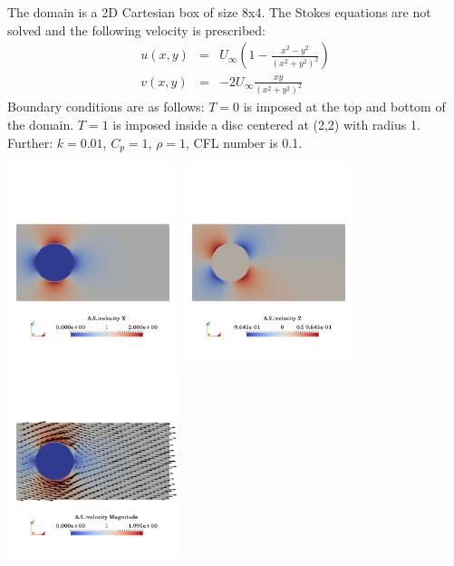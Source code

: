 The domain is a 2D Cartesian box of size 8x4.
The Stokes equations are not solved and the following velocity is prescribed:
\begin{eqnarray}
u(x,y)&=& U_\infty \left(  1-\frac{x^2-y^2}{(x^2+y^2)^2}  \right) \\
v(x,y)&=& -2U_\infty \frac{xy}{(x^2+y^2)^2}
\end{eqnarray}
Boundary conditions are as follows:
$T=0$ is imposed at the top and bottom of the domain. 
$T=1$ is imposed inside a disc centered at (2,2) with radius 1.  
Further: $k=0.01$, $C_p=1$, $\rho=1$, CFL number is 0.1.

\begin{center}
\includegraphics[width=5cm]{images/benchmark_heatcyl/u}
\includegraphics[width=5cm]{images/benchmark_heatcyl/w}
\includegraphics[width=5cm]{images/benchmark_heatcyl/vel}
\end{center}

